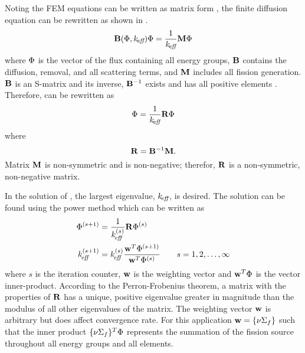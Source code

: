   Noting the FEM equations can be written as matrix form
  , the finite diffusion equation can be rewritten as
  shown in \cite{gehinThesis}.
  \begin{equation}
    \label{eq:gehin_notation}
    \mathbf{B}(\Phi,k_{\!\mbox{\scriptsize \em eff}}) \Phi = \frac{1}{k_{\!\mbox{\scriptsize \em eff}}} \mathbf{M} \Phi
  \end{equation}
  where $\Phi$ is the vector of the flux containing all energy groups, $\mathbf{B}$
  contains the diffusion, removal, and all scattering terms, and $\mathbf{M}$ includes
  all fission generation. $\mathbf{B}$ is an S-matrix and its inverse, $\mathbf{B}^{-1}$
  exists and has all positive elements \cite{nakamura}. Therefore,
   can be rewritten as
  \begin{equation}
    \label{eq:gehin_solution}
    \Phi = \frac{1}{k_{\!\mbox{\scriptsize \em eff}}} \mathbf{R} \Phi
  \end{equation}
  where
  \begin{equation}
    \label{eq:gehin_r}
    \mathbf{R} = \mathbf{B}^{-1} \mathbf{M}.
  \end{equation}
  Matrix $\mathbf{M}$ is non-symmetric and is non-negative; therefor, $\mathbf{R}$ is a
  non-symmetric, non-negative matrix.

  In the solution of , the largest eigenvalue,
  $k_{\!\mbox{\scriptsize \em eff}}$, is desired. The solution can be found using the power method which 
  can be written as 
  \begin{align}
    \label{eq:power_iteration_e1}
    \Phi^{(s+1)} &= \frac{1}{k_{\!\mbox{\scriptsize \em eff}}^{(s)}} \mathbf{R} \Phi^{(s)} \\
    \label{eq:power_iteration_e2}
    k_{\!\mbox{\scriptsize \em eff}}^{(s+1)} &= k_{\!\mbox{\scriptsize \em eff}}^{(s)} \frac{\mathbf{w}^{T} \Phi^{(s+1)}}
      {\mathbf{w}^{T} \Phi^{(s)}} \qquad s = 1,2,\ldots,\infty
  \end{align}
  where $s$ is the iteration counter, $\mathbf{w}$ is the weighting vector and 
  $\mathbf{w}^{T} \Phi$ is the vector inner-product. According to the Perron-Frobenius
  theorem, a matrix with the properties of $\mathbf{R}$ has a unique, positive
  eigenvalue greater in magnitude than the modulus of all other eigenvalues of
  the matrix. The weighting vector $\mathbf{w}$ is arbitrary but does affect
  convergence rate. For this application $\mathbf{w} = \{\nu \Sigma_f\}$ such that the
  inner product $\{\nu \Sigma_f\}^T \Phi$ represents the summation of the
  fission source throughout all energy groups and all elements. 
  
  
